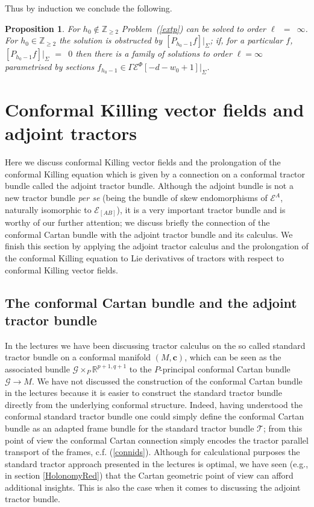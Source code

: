 \documentclass[a4paper,12pt]{amsart}
\def\Cal{\mathcal}
\newcommand{\cc}{\boldsymbol{c}}
\newcommand{\ce}{{\Cal E}}
\newtheorem{proposition}[theorem]{Proposition}
\theoremstyle{remark}
\newcommand{\nn}[1]{(\ref{#1})}
\begin{document}
Thus by induction we conclude the following.
\begin{proposition}\label{gformal}
  For $h_0\notin \mathbb{Z}_{\geq 2}$ Problem~\nn{extp} can be solved
  to order $\ell$~$=$~$\infty$. For $h_0\in \mathbb{Z}_{\geq 2}$ the solution is
  obstructed by $[P_{h_0-1} f]|_\Sigma$; if, for a particular $f$,
  $[P_{h_0-1} f]|_\Sigma$ $=$~$0$ then there is a family of solutions to
  order $\ell=\infty$ parametrised by sections $f_{h_0-1}\in \Gamma
  \ce^\Phi[-d-w_0+1]|_\Sigma$.
\end{proposition}


 
\appendix

\section{Conformal Killing vector fields and adjoint tractors}

Here we discuss conformal Killing vector fields and the prolongation
of the conformal Killing equation which is given by a connection on a
conformal tractor bundle called the adjoint tractor bundle. Although
the adjoint bundle is not a new tractor bundle \emph{per se} (being
the bundle of skew endomorphisms of $\ce^A$, naturally isomorphic to
$\ce_{[AB]}$), it is a very important tractor bundle and is worthy of
our further attention; we discuss briefly the connection of the
conformal Cartan bundle with the adjoint tractor bundle and its
calculus. We finish this section by applying the adjoint tractor
calculus and the prolongation of the conformal Killing equation to Lie
derivatives of tractors with respect to conformal Killing vector
fields.

\subsection{The conformal Cartan bundle and the adjoint tractor bundle} \label{CartanConn}

In the lectures we have been discussing tractor calculus on the so called standard tractor bundle on a conformal manifold $(M,\cc)$, which can be seen as the associated bundle $\mathcal{G}\times_P \mathbb{R}^{p+1,q+1}$ to the $P$-principal conformal Cartan bundle $\mathcal{G}\rightarrow M$. We have not discussed the construction of the conformal Cartan bundle in the lectures because it is easier to construct the standard tractor bundle directly from the underlying conformal structure. Indeed, having understood the conformal standard tractor bundle one could simply define the conformal Cartan bundle as an adapted frame bundle for the standard tractor bundle $\mathcal{T}$; from this point of view the conformal Cartan connection simply encodes the tractor parallel transport of the frames, c.f. \nn{connids}. Although for calculational purposes the standard tractor approach presented in the lectures is optimal, we have seen (e.g., in section \ref{HolonomyRed}) that the Cartan geometric point of view can afford additional insights. This is also the case when it comes to discussing the adjoint tractor bundle.
\end{document}
